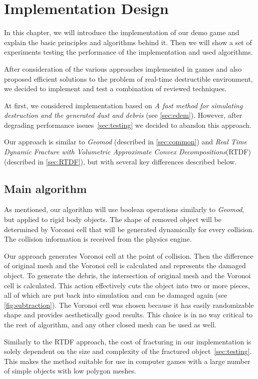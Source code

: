 \chapter{Implementation Design}
\label{chaptImplementation}
In this chapter, we will introduce the implementation of our demo game and explain the basic principles and algorithms behind it. Then we will show a set of experiments testing the performance of the implementation and used algorithms.

After consideration of the various approaches implemented in games and also proposed efficient solutions to the problem of real-time destructible environment, we decided to implement and test a combination of reviewed techniques.  

At first, we considered implementation based on \emph{A fast method for simulating destruction and the generated dust and debris} (see \cref{sec:edem}). However, after degrading performance issues~\cref{sec:testing} we decided to abandon this approach.

Our approach is similar to \emph{Geomod} (described in \cref{sec:common}) and \emph{Real Time Dynamic Fracture with Volumetric Approximate Convex Decompositions}(RTDF) (described in \cref{sec:RTDF}), but with several key differences described below. 

\section{Main algorithm}
As mentioned, our algorithm will use boolean operations similarly to \emph{Geomod}, but applied to rigid body objects. The shape of removed object will be determined by Voronoi cell that will be generated dynamically for every collision. The collision information is received from the physics engine.

Our approach generates Voronoi cell at the point of collision. Then the difference of original mesh and the Voronoi cell is calculated and represents the damaged object. To generate the debris, the intersection of original mesh and the Voronoi cell is calculated. This action effectively cuts the object into two or more pieces, all of which are put back into simulation and can be damaged again (see \cref{fig:subtraction}). The Voronoi cell was chosen because it has easily randomizable shape and provides aesthetically good results. This choice is in no way critical to the rest of algorithm, and any other closed mesh can be used as well.

Similarly to the RTDF approach, the cost of fracturing in our implementation is solely dependent on the size and complexity of the fractured object~\cref{sec:testing}. This makes the method suitable for use in computer games with a large number of simple objects with low polygon meshes.

